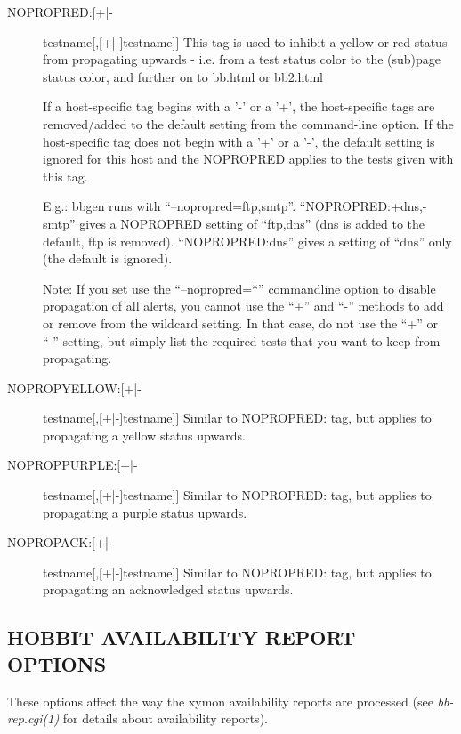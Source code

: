  \begin{description}
\item[NOPROPRED:[+|-]testname[,[+|-]testname]] This tag is used to
  inhibit a yellow or red status from propagating upwards - i.e. from
  a test status color to the (sub)page status color, and further on to
  bb.html or bb2.html 


  If a host-specific tag begins with a '-' or a '+', the host-specific
  tags are removed/added to the default setting from the command-line
  option. If the host-specific tag does not begin with a '+' or a '-',
  the default setting is ignored for this host and the NOPROPRED
  applies to the tests given with this tag. 



  E.g.: bbgen runs with
  ``--nopropred=ftp,smtp''. ``NOPROPRED:+dns,-smtp'' gives a NOPROPRED
  setting of ``ftp,dns'' (dns is added to the default, ftp is
  removed). ``NOPROPRED:dns'' gives a setting of ``dns'' only (the
  default is ignored). 



  Note: If you set use the ``--nopropred=*'' commandline option to
  disable propagation of all alerts, you cannot use the ``+'' and
  ``-'' methods to add or remove from the wildcard setting. In that
  case, do not use the ``+'' or ``-'' setting, but simply list the
  required tests that you want to keep from propagating. 


\item[NOPROPYELLOW:[+|-]testname[,[+|-]testname]] Similar to
  NOPROPRED: tag, but applies to propagating a yellow status upwards. 


\item[NOPROPPURPLE:[+|-]testname[,[+|-]testname]] Similar to
  NOPROPRED: tag, but applies to propagating a purple status upwards. 


 

\item[NOPROPACK:[+|-]testname[,[+|-]testname]] Similar to NOPROPRED:
  tag, but applies to propagating an acknowledged status upwards. 


\end{description}

\subsection{HOBBIT AVAILABILITY REPORT OPTIONS}
 These options affect the way the xymon availability reports are processed (see \emph{bb-rep.cgi(1)}
 for details about availability reports). 

